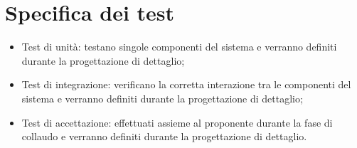 \section{Specifica dei test}
\begin{itemize}
    \item Test di unità: testano singole componenti del sistema e verranno definiti durante la progettazione di dettaglio;
    \item Test di integrazione: verificano la corretta interazione tra le componenti del sistema e verranno definiti durante la progettazione di dettaglio;
    \item Test di accettazione: effettuati assieme al proponente durante la fase di collaudo e verranno definiti durante la progettazione di dettaglio.
\end{itemize}
